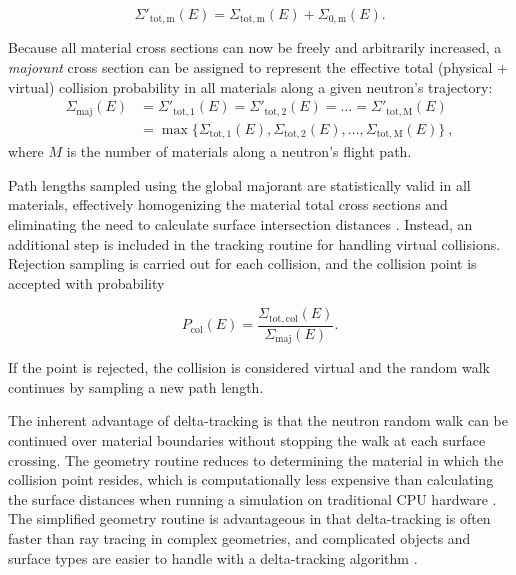 \begin{equation}
\Sigma'_{\mathrm{tot,m}}(E) = \Sigma_{\mathrm{tot,m}}(E) + \Sigma_\mathrm{{0,m}}(E).
\end{equation}

Because all material cross sections can now be freely and arbitrarily increased, a \textit{majorant} cross
section can be assigned to represent the effective total (physical + virtual) collision probability in all
materials along a given neutron's trajectory:
\begin{equation}
\label{eq:maj}
\begin{aligned}
\Sigma_{\mathrm{maj}}(E) &= \Sigma'_{\mathrm{tot,1}}(E) = \Sigma'_{\mathrm{tot,2}}(E) = \ldots = 
\Sigma'_{\mathrm{tot,M}}(E) \\
& = \max\{\Sigma_{\mathrm{tot,1}}(E), \Sigma_{\mathrm{tot,2}}(E), \ldots, \Sigma_{\mathrm{tot,M}}(E)\}\:,
\end{aligned}
\end{equation}
where $M$ is the number of materials along a neutron's flight path.

Path lengths sampled using the global majorant are statistically valid in all materials, effectively
homogenizing the material total cross sections and eliminating the need to calculate surface intersection
distances \cite{serp_delta}. Instead, an additional step is included in the tracking routine for handling 
virtual collisions. Rejection sampling is carried out for each collision, and the collision point is 
accepted with probability 

\begin{equation}
P_{\mathrm{col}}(E) = \frac{\Sigma_{\mathrm{tot,col}}(E)}{\Sigma_{\mathrm{maj}}(E)}. 
\end{equation}

\noindent If the point is rejected, the collision is considered virtual and the random walk continues by 
sampling a new path length.

The inherent advantage of delta-tracking is that the neutron random walk can be continued over material
boundaries without stopping the walk at each surface crossing. The geometry routine reduces to
determining the material in which the collision point resides, which is computationally less expensive 
than calculating the surface distances when running a simulation on traditional CPU hardware 
\cite{serp_delta}. The simplified geometry routine is advantageous in that delta-tracking is often faster 
than ray tracing in complex geometries, and complicated objects and surface types are easier to handle 
with a delta-tracking algorithm \cite{serp_delta}.

